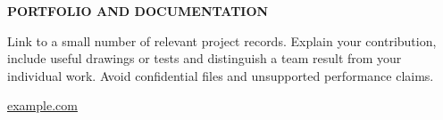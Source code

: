 \documentclass[10pt,a4paper]{article}
\newcommand{\portfolio}{https://example.com}
\newenvironment{cvpanel}[1]{\par\vspace{6pt}{\color{line}\hrule}\vspace{7pt}\begin{minipage}[t]{.23\linewidth}{\color{blue}\small\bfseries\MakeUppercase{#1}}\end{minipage}\hfill\begin{minipage}[t]{.73\linewidth}}{\end{minipage}\par\vspace{10pt}}
\begin{document}
\begin{cvpanel}{Portfolio and documentation}
Link to a small number of relevant project records. Explain your contribution, include useful drawings or tests and distinguish a team result from your individual work. Avoid confidential files and unsupported performance claims.\par\href{\portfolio}{example.com}
\end{cvpanel}
\end{document}
